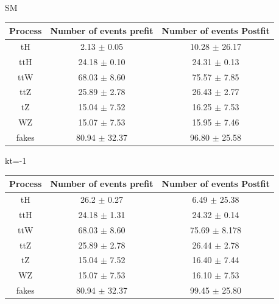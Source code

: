 \documentclass[11pt]{beamer}
\begin{document}
\begin{frame}
SM
	\begin{tabular}{|c|c|c|}
	\hline
	Process  & Number of events prefit    & Number of events Postfit \\
	\hline
	tH & 2.13 $\pm$ 0.05  & 10.28 $\pm$ 26.17\\
	\hline
	ttH  &  24.18 $\pm$ 0.10 & 24.31 $\pm$ 0.13 \\
	\hline
	ttW  &  68.03 $\pm$ 8.60 & 75.57 $\pm$ 7.85\\
	\hline
	ttZ  & 25.89 $\pm$ 2.78 & 26.43 $\pm$ 2.77\\
	\hline
	tZ & 15.04 $\pm$ 7.52 & 16.25 $\pm$ 7.53\\
	\hline
	WZ & 15.07 $\pm$ 7.53 & 15.95 $\pm$ 7.46\\
	\hline
	fakes  & 80.94 $\pm$ 32.37  & 96.80 $\pm$ 25.58\\
	\hline
\end{tabular}	
\end{frame}

\begin{frame}
kt=-1
	\begin{tabular}{|c|c|c|}
	\hline
	Process  & Number of events prefit    & Number of events Postfit \\
	\hline
	tH & 26.2 $\pm$ 0.27 & 6.49 $\pm$ 25.38\\
	\hline
	ttH  & 24.18 $\pm$ 1.31& 24.32 $\pm$ 0.14\\
	\hline
	ttW  & 68.03  $\pm$ 8.60 & 75.69 $\pm$ 8.178\\
	\hline
	ttZ  & 25.89  $\pm$  2.78& 26.44 $\pm$ 2.78\\
	\hline
	tZ & 15.04  $\pm$ 7.52 & 16.40 $\pm$ 7.44\\
	\hline
	WZ & 15.07  $\pm$ 7.53& 16.10 $\pm$ 7.53\\
	\hline
	fakes  & 80.94   $\pm$ 32.37& 99.45 $\pm$ 25.80\\
	\hline
\end{tabular}	
\end{frame}
\end{document}
